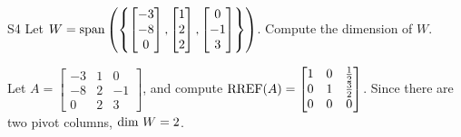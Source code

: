 \documentclass{sbgLAquiz}
\begin{document}
\begin{problem}{S4}
Let $W = {\rm span} \left( \left\{  \begin{bmatrix} -3 \\ -8 \\ 0 \end{bmatrix}, \begin{bmatrix} 1 \\ 2 \\ 2 \end{bmatrix}, \begin{bmatrix} 0 \\ -1 \\ 3 \end{bmatrix} \right\} \right)$.  Compute the dimension of $W$.
\end{problem}
\begin{solution}
Let $A= \begin{bmatrix}-3 & 1 & 0 \\ -8 & 2 & -1 \\ 0 & 2 & 3\end{bmatrix}$, and compute $\operatorname{RREF}(A) = \begin{bmatrix} 1 & 0 & \frac{1}{2} \\ 0 & 1 & \frac{3}{2} \\ 0 & 0 & 0 \end{bmatrix}$.
Since there are two pivot columns, ${\rm dim}\ W = 2$.  
\end{solution}
\end{document}
